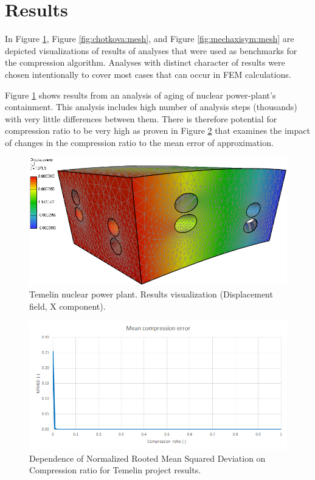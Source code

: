 \section{Results}
\label{sec:results}

In Figure \ref{fig:temelin:mesh}, Figure \ref{fig:chotkova:mesh}, and Figure \ref{fig:mechaxisym:mesh} are depicted visualizations of results of analyses that were used as benchmarks for the compression algorithm. Analyses with distinct character of results were chosen intentionally to cover most cases that can occur in FEM calculations.

Figure \ref{fig:temelin:mesh} shows results from an analysis of aging of nuclear power-plant's containment. This analysis includes high number of analysis steps (thousands) with very little differences between them. There is therefore potential for compression ratio to be very high as proven in Figure \ref{fig:temelin:NRMSD} that examines the impact of changes in the compression ratio to the mean error of approximation.

\begin{figure}[H]
\centering\includegraphics[width=\textwidth]{figures/temelin_screenshot}
\caption{Temelin nuclear power plant. Results visualization (Displacement field, X component).}
\label{fig:temelin:mesh}
\end{figure}

\begin{figure}[H]
\centering\includegraphics[width=\textwidth]{figures/temelin_NRMSD}
\caption{Dependence of Normalized Rooted Mean Squared Deviation on Compression ratio for Temelin project results.}
\label{fig:temelin:NRMSD}
\end{figure}


